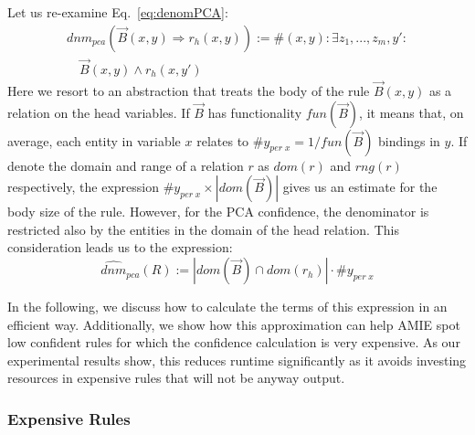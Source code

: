 Let us re-examine Eq.~\ref{eq:denomPCA}:
\[
\begin{array}{rl}
 dnm_{pca}(\vec{B}(x,y) \Rightarrow r_h(x,y)) := {} \#(x,y): \exists z_1,...,z_m,y': \\ \quad \vec{B}(x, y) \wedge r_h(x,y')
\end{array}
\]
Here we resort to an abstraction that treats the body of the rule $\vec{B}(x, y)$ as a relation on the head variables. 
If $\vec{B}$ has functionality $fun(\vec{B})$, it means that, on average, each entity in variable $x$ 
relates to $\#y_{per\; x} = 1/fun(\vec{B})$ bindings in $y$. If denote the domain and range of a relation $r$ as
$dom(r)$ and $rng(r)$ respectively, the expression $\#y_{per\; x} \times |dom(\vec{B})|$ gives us 
an estimate for the body size of the rule. 
However, for the PCA confidence, the denominator is restricted also by the entities in the domain of the head relation.
This consideration leads us to the expression:
\begin{equation} \label{eq:pcaApproxConf_general}
  \widehat{dnm}_{pca}(R):=|dom(\vec{B}) \cap dom(r_h)|\cdot \#y_{per\; x}
\end{equation}

In the following, we discuss how to calculate the terms of this expression in an efficient way. Additionally, we show 
how this approximation can help AMIE spot low confident rules for which the confidence
calculation is very expensive. As our experimental results show, this reduces runtime significantly 
as it avoids investing resources in expensive rules that will not be anyway output.

\subsubsection{Expensive Rules}\label{sec:expensive_rules}

